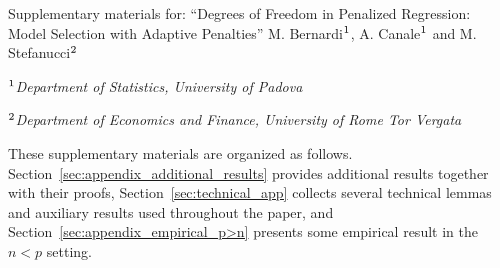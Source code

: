 \documentclass[a4paper, 12pt]{article}
\begin{document}


%
%
%


\newpage
\renewcommand{\theequation}{S.\arabic{equation}}
\renewcommand{\thesection}{S.\arabic{section}}
\renewcommand{\thetable}{S.\arabic{table}}
\renewcommand{\theproposition}{S.\arabic{proposition}}
\renewcommand{\thetheorem}{S.\arabic{theorem}}
\renewcommand{\thecorollary}{S.\arabic{corollary}}

\setcounter{equation}{0}
\setcounter{table}{0}
\setcounter{section}{0}
\setcounter{proposition}{0}
\setcounter{corollary}{0}
\setcounter{theorem}{0}
\setcounter{page}{1}
\setcounter{footnote}{0}

\begin{center}
{\LARGE Supplementary materials for:
\vskip3mm
``Degrees of Freedom in Penalized Regression:\\ Model Selection with Adaptive Penalties''}
\vskip7mm
M. Bernardi$\null^{1}$, A. Canale$\null^{1}$ and M. Stefanucci$\null^{2}$
	\vskip5mm
	\centerline{\textit{$\null^1$Department of Statistics,
University of Padova}}
\vskip1mm
\centerline{\textit{ $\null^2$Department of Economics and Finance,
University of Rome Tor Vergata}}
\vskip6mm
\end{center}

\noindent These supplementary materials are organized as follows.  
Section~\ref{sec:appendix_additional_results} provides additional results together with their proofs, Section~\ref{sec:technical_app} collects several technical lemmas and auxiliary results used throughout the paper, and Section~\ref{sec:appendix_empirical_p>n} presents some empirical result in the $n<p$ setting.
%
%
%
\end{document}
